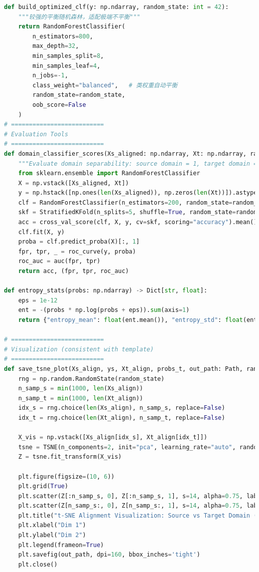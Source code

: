 \documentclass[a4paper]{CPIPC}
\numberwithin{equation}{section}
\begin{document}
\begin{lstlisting}[language=Python, caption=Random Forest Classifier]
def build_optimized_clf(y: np.ndarray, random_state: int = 42):
    """较强的平衡随机森林，适配极端不平衡"""
    return RandomForestClassifier(
        n_estimators=800,
        max_depth=32,
        min_samples_split=8,
        min_samples_leaf=4,
        n_jobs=-1,
        class_weight="balanced",   # 类权重自动平衡
        random_state=random_state,
        oob_score=False
    )
# ==========================
# Evaluation Tools
# ==========================
def domain_classifier_scores(Xs_aligned: np.ndarray, Xt: np.ndarray, random_state: int = 42):
    """Evaluate domain separability: source domain = 1, target domain = 0; closer to 0.5 is better"""
    from sklearn.ensemble import RandomForestClassifier
    X = np.vstack([Xs_aligned, Xt])
    y = np.hstack([np.ones(len(Xs_aligned)), np.zeros(len(Xt))]).astype(int)
    clf = RandomForestClassifier(n_estimators=200, random_state=random_state, n_jobs=-1)
    skf = StratifiedKFold(n_splits=5, shuffle=True, random_state=random_state)
    acc = cross_val_score(clf, X, y, cv=skf, scoring="accuracy").mean()
    clf.fit(X, y)
    proba = clf.predict_proba(X)[:, 1]
    fpr, tpr, _ = roc_curve(y, proba)
    roc_auc = auc(fpr, tpr)
    return acc, (fpr, tpr, roc_auc)

def entropy_stats(probs: np.ndarray) -> Dict[str, float]:
    eps = 1e-12
    ent = -(probs * np.log(probs + eps)).sum(axis=1)
    return {"entropy_mean": float(ent.mean()), "entropy_std": float(ent.std())}

# ==========================
# Visualization (consistent with template)
# ==========================
def save_tsne_plot(Xs_align, ys, Xt_align, probs_t, out_path: Path, random_state: int = 42):
    rng = np.random.RandomState(random_state)
    n_samp_s = min(1000, len(Xs_align))
    n_samp_t = min(1000, len(Xt_align))
    idx_s = rng.choice(len(Xs_align), n_samp_s, replace=False)
    idx_t = rng.choice(len(Xt_align), n_samp_t, replace=False)

    X_vis = np.vstack([Xs_align[idx_s], Xt_align[idx_t]])
    tsne = TSNE(n_components=2, init="pca", learning_rate="auto", random_state=random_state, perplexity=30)
    Z = tsne.fit_transform(X_vis)

    plt.figure(figsize=(10, 6))
    plt.grid(True)
    plt.scatter(Z[:n_samp_s, 0], Z[:n_samp_s, 1], s=14, alpha=0.75, label="Source Domain (True Labels)")
    plt.scatter(Z[n_samp_s:, 0], Z[n_samp_s:, 1], s=14, alpha=0.75, label="Target Domain (Pseudo Labels)")
    plt.title("t-SNE Alignment Visualization: Source vs Target Domain (TCA)")
    plt.xlabel("Dim 1")
    plt.ylabel("Dim 2")
    plt.legend(frameon=True)
    plt.savefig(out_path, dpi=160, bbox_inches='tight')
    plt.close()


\end{lstlisting}
\end{document}

